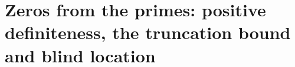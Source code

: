 \chapter{Zeros from the primes: positive definiteness, the truncation bound and blind location}\label{vol3:ch12}

